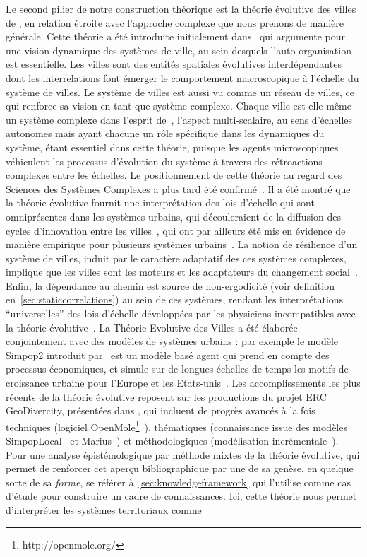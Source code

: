 {Le second pilier de notre construction théorique est la théorie évolutive des villes de , en relation étroite avec l'approche complexe que nous prenons de manière générale. Cette théorie a été introduite initialement dans~\cite{pumain1997pour} qui argumente pour une vision dynamique des systèmes de ville, au sein desquels l'auto-organisation est essentielle. Les villes sont des entités spatiales évolutives interdépendantes dont les interrelations font émerger le comportement macroscopique à l'échelle du système de villes. Le système de villes est aussi vu comme un réseau de villes, ce qui renforce sa vision en tant que système complexe. Chaque ville est elle-même un système complexe dans l'esprit de~\cite{berry1964cities}, l'aspect multi-scalaire, au sens d'échelles autonomes mais ayant chacune un rôle spécifique dans les dynamiques du système, étant essentiel dans cette théorie, puisque les agents microscopiques véhiculent les processus d'évolution du système à travers des rétroactions complexes entre les échelles. Le positionnement de cette théorie au regard des Sciences des Systèmes Complexes a plus tard été confirmé~\cite{pumain2003approche}. Il a été montré que la théorie évolutive fournit une interprétation des lois d'échelle qui sont omniprésentes dans les systèmes urbains, qui découleraient de la diffusion des cycles d'innovation entre les villes~\cite{pumain2006evolutionary}, qui ont par ailleurs été mis en évidence de manière empirique pour plusieurs systèmes urbains~\cite{pumain2009innovation}. La notion de résilience d'un système de villes, induit par le caractère adaptatif des ces systèmes complexes, implique que les villes sont les moteurs et les adaptateurs du changement social~\cite{pumain2010theorie}. Enfin, la dépendance au chemin est source de non-ergodicité (voir definition en~\ref{sec:staticcorrelations}) au sein de ces systèmes, rendant les interprétations ``universelles'' des lois d'échelle développées par les physiciens incompatibles avec la théorie évolutive~\cite{pumain2010theorie}. La Théorie Evolutive des Villes a été élaborée conjointement avec des modèles de systèmes urbains : par exemple le modèle Simpop2 introduit par~\cite{bretagnolle2006theory} est un modèle basé agent qui prend en compte des processus économiques, et simule sur de longues échelles de temps les motifs de croissance urbaine pour l'Europe et les Etats-unis~\cite{doi:10.1177/0042098010377366}. Les accomplissements les plus récents de la théorie évolutive reposent sur les productions du projet ERC GeoDivercity, présentées dans \cite{pumain2017urban}, qui incluent de progrès avancés à la fois techniques (logiciel OpenMole\footnote{http://openmole.org/}~\cite{reuillon2013openmole}), thématiques (connaissance issue des modèles SimpopLocal~\cite{schmitt2014modelisation} et Marius~\cite{cottineau2014evolution}) et méthodologiques (modélisation incrémentale~\cite{cottineau2015incremental}). Pour une analyse épistémologique par méthode mixtes de la théorie évolutive, qui permet de renforcer cet aperçu bibliographique par une de sa genèse, en quelque sorte de sa \emph{forme}, se référer à~\ref{sec:knowledgeframework} qui l'utilise comme cas d'étude pour construire un cadre de connaissances. Ici, cette théorie nous permet d'interpréter les systèmes territoriaux comme }
